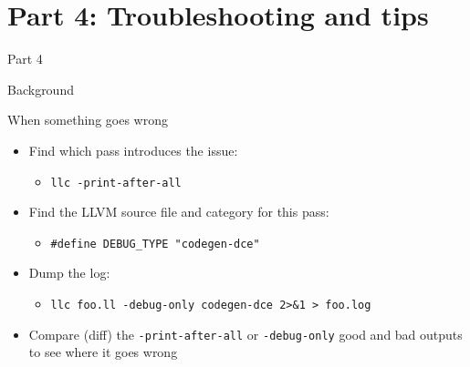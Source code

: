 \section{Part 4: Troubleshooting and tips}

\begin{frame}{Part 4}

Background

\end{frame}


\begin{frame}{When something goes wrong}

\begin{itemize}
    \item Find which pass introduces the issue:
    \begin{itemize}
        \item \texttt{llc -print-after-all}
    \end{itemize}
    \item Find the LLVM source file and category for this pass:
    \begin{itemize}
        \item \texttt{\#define DEBUG\_TYPE "codegen-dce"}
    \end{itemize}
    \item Dump the log:
    \begin{itemize}
        \item \texttt{llc foo.ll -debug-only codegen-dce 2>\&1 > foo.log}
    \end{itemize}
    \item Compare (diff) the \texttt{-print-after-all} or \texttt{-debug-only} good and bad outputs to see where it goes wrong
\end{itemize}

\end{frame}


